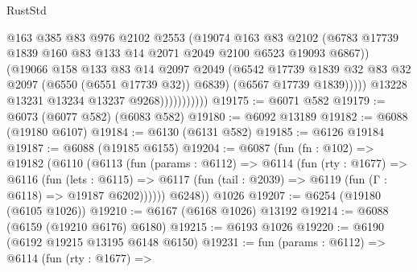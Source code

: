 \begin{lexlean}{RustStd}
\begin{coremodule}
                                @163
                                @385
                                @83
                                @976
                                @2102
                                @2553
                                (@19074
                                  @163
                                  @83
                                  @2102
                                  (@6783
                                    @17739
                                    @1839
                                    @160
                                    @83
                                    @133
                                    @14
                                    @2071
                                    @2049
                                    @2100
                                    @6523
                                    @19093
                                    @6867))
                                (@19066
                                  @158
                                  @133
                                  @83
                                  @14
                                  @2097
                                  @2049
                                  (@6542
                                    @17739
                                    @1839
                                    @32
                                    @83
                                    @32
                                    @2097
                                    (@6550 (@6551 @17739 @32))
                                    @6839)
                                  (@6567 @17739 @1839)))))
                          @13228
                          @13231
                          @13234
                          @13237
                          @9268)))))))))))
@19175 := @6071 @582
@19179 := @6073 (@6077 @582) (@6083 @582)
@19180 := @6092 @13189
@19182 := @6088 (@19180 @6107)
@19184 := @6130 (@6131 @582)
@19185 := @6126 @19184
@19187 := @6088 (@19185 @6155)
@19204 := @6087
    (fun (fn : @102) =>
    @19182
      (@6110
        (@6113
          (fun (params : @6112) =>
          @6114
            (fun (rty : @1677) =>
            @6116
              (fun (lets : @6115) =>
              @6117 (fun (tail : @2039) => @6119 (fun (Γ : @6118) => @19187 @6202))))))
        @6248))
    @1026
@19207 := @6254 (@19180 (@6105 @1026))
@19210 := @6167 (@6168 @1026) @13192
@19214 := @6088 (@6159 (@19210 @6176) @6180)
@19215 := @6193 @1026
@19220 := @6190 (@6192 @19215 @13195 @6148 @6150)
@19231 := fun (params : @6112) =>
  @6114
    (fun (rty : @1677) =>

\end{coremodule}
\end{lexlean}
